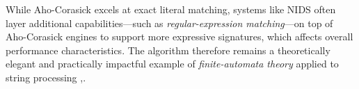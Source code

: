 While Aho-Corasick excels at exact literal matching, systems like NIDS often layer additional capabilities---such as \textit{regular-expression matching}---on top of Aho-Corasick engines to support more expressive signatures, which affects overall performance characteristics. The algorithm therefore remains a theoretically elegant and practically impactful example of \textit{finite-automata theory} applied to string processing \cite{Gusfield1997},\cite{YARADocs}.

